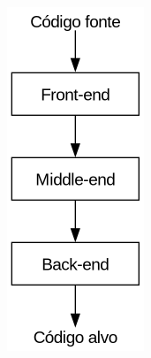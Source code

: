 \documentclass[11pt]{article}
\begin{document}
\begin{center}
\includegraphics[width=.9\linewidth]{compiler_structure.png}
\label{}
\end{center}
\end{document}
